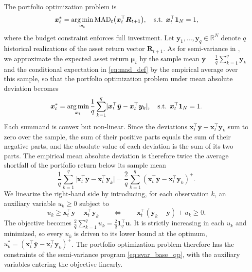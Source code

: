 The portfolio optimization problem is
\begin{equation} \label{eq:mad_risk_min}
    \bm{x}_t^* = \operatorname*{arg\,min}_{\bm{x}_t} \text{MAD}_t\bigl( \bm{x}_t^\top \bm{R}_{t+1} \bigr),
    \quad \text{s.t. } \bm{x}_t^\top \bm{1}_N = 1,
\end{equation}
where the budget constraint enforces full investment. Let $\bm{y}_1, \dots, \bm{y}_q \in \mathbb{R}^N$ denote $q$
historical realizations of the asset return vector $\bm{R}_{t+1}$. As for semi-variance in , we
approximate the expected asset return $\bm{\mu}_t$ by the sample mean
$\bar{\bm{y}} = \frac{1}{q} \sum_{k=1}^q \bm{y}_k$ and the conditional expectation in \eqref{eq:mad_def} by the
empirical average over this sample, so that the portfolio optimization problem under mean absolute deviation becomes
\begin{equation} \label{eq:empirical_mad}
    \bm{x}_t^* = \operatorname*{arg\,min}_{\bm{x}_t} \frac{1}{q} \sum_{k=1}^q
    \lvert \bm{x}_t^\top \bar{\bm{y}} - \bm{x}_t^\top \bm{y}_k \rvert,
    \quad \text{s.t. } \bm{x}_t^\top \bm{1}_N = 1.
\end{equation}
Each summand is convex but non-linear. Since the deviations $\bm{x}_t^\top \bar{\bm{y}} - \bm{x}_t^\top \bm{y}_k$ sum
to zero over the sample, the sum of their positive parts equals the sum of their negative parts, and the absolute value
of each deviation is the sum of its two parts. The empirical mean absolute deviation is therefore twice the average
shortfall of the portfolio return below its sample mean \cite{Speranza1993, OgryczakRuszczynski1999}
\begin{equation} \label{eq:mad_identity}
    \frac{1}{q} \sum_{k=1}^q \lvert \bm{x}_t^\top \bar{\bm{y}} - \bm{x}_t^\top \bm{y}_k \rvert
    = \frac{2}{q} \sum_{k=1}^q (\bm{x}_t^\top \bar{\bm{y}} - \bm{x}_t^\top \bm{y}_k)^+.
\end{equation}
We linearize the right-hand side by introducing, for each observation $k$, an auxiliary variable $u_k \ge 0$ subject
to
\begin{equation} \label{eq:mad_slack}
    u_k \ge \bm{x}_t^\top \bar{\bm{y}} - \bm{x}_t^\top \bm{y}_k
    \qquad \Longleftrightarrow \qquad
    \bm{x}_t^\top (\bm{y}_k - \bar{\bm{y}}) + u_k \ge 0.
\end{equation}
The objective becomes
$\frac{2}{q} \sum_{k=1}^q u_k = \frac{2}{q} \bm{1}_q^\top \bm{u}$. It is strictly increasing in each $u_k$ and
minimized, so every $u_k$ is driven to its lower bound at the optimum,
$u_k^* = (\bm{x}_t^\top \bar{\bm{y}} - \bm{x}_t^\top \bm{y}_k)^+$. The portfolio optimization problem therefore has the
constraints of the semi-variance program \eqref{eq:svar_base_qp}, with the auxiliary variables entering the objective
linearly.

